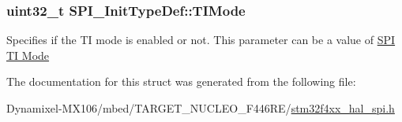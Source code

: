 \subsubsection[{\texorpdfstring{T\+I\+Mode}{TIMode}}]{\setlength{\rightskip}{0pt plus 5cm}uint32\+\_\+t S\+P\+I\+\_\+\+Init\+Type\+Def\+::\+T\+I\+Mode}\hypertarget{struct_s_p_i___init_type_def_a60db7e87bb66775df6213e4006dfd876}{}\label{struct_s_p_i___init_type_def_a60db7e87bb66775df6213e4006dfd876}
Specifies if the TI mode is enabled or not. This parameter can be a value of \hyperlink{group___s_p_i___t_i__mode}{S\+PI TI Mode} 

The documentation for this struct was generated from the following file\+:\begin{DoxyCompactItemize}
\item 
Dynamixel-\/\+M\+X106/mbed/\+T\+A\+R\+G\+E\+T\+\_\+\+N\+U\+C\+L\+E\+O\+\_\+\+F446\+R\+E/\hyperlink{stm32f4xx__hal__spi_8h}{stm32f4xx\+\_\+hal\+\_\+spi.\+h}\end{DoxyCompactItemize}
